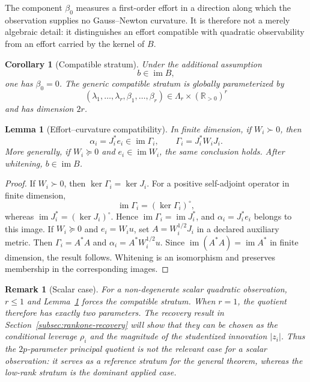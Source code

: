 \documentclass[10pt,a4paper]{article}
\newtheorem{corollary}[theorem]{Corollary}
\newtheorem{lemma}[theorem]{Lemma}
\newtheorem{remark}[theorem]{Remark}
\newcommand{\R}{\mathbb{R}}
\newcommand{\Ker}{\operatorname{ker}}
\newcommand{\Img}{\operatorname{im}}
\begin{document}
The component $\beta_0$ measures a first-order effort in a direction along which the observation supplies no Gauss--Newton curvature. It is therefore not a merely algebraic detail: it distinguishes an effort compatible with quadratic observability from an effort carried by the kernel of $B$.

\begin{corollary}[Compatible stratum]
Under the additional assumption
\[
b\in\Img B,
\]
one has $\beta_0=0$. The generic compatible stratum is globally parameterized by
\[
(\lambda_1,\ldots,\lambda_r,
 \beta_1,\ldots,\beta_r)
\in\Lambda_r\times(\R_{>0})^r
\]
and has dimension $2r$.
\label{cor:compatible-stratum}
\end{corollary}

\begin{lemma}[Effort--curvature compatibility]
In finite dimension, if $W_i\succ0$, then
\begin{equation}
\boxed{
\alpha_i=J_i^*e_i\in\Img\Gamma_i,
\qquad
\Gamma_i=J_i^*W_iJ_i.
}
\label{eq:compatibility-lemma}
\end{equation}
More generally, if $W_i\succeq0$ and $e_i\in\Img W_i$, the same conclusion holds. After whitening, $b\in\Img B$.
\label{lem:effort-curvature-compatibility}
\end{lemma}

\begin{proof}
If $W_i\succ0$, then $\Ker\Gamma_i=\Ker J_i$. For a positive self-adjoint operator in finite dimension,
\[
\Img\Gamma_i=(\Ker\Gamma_i)^\circ,
\]
whereas $\Img J_i^*=(\Ker J_i)^\circ$. Hence $\Img\Gamma_i=\Img J_i^*$, and $\alpha_i=J_i^*e_i$ belongs to this image. If $W_i\succeq0$ and $e_i=W_iu$, set $A=W_i^{1/2}J_i$ in a declared auxiliary metric. Then $\Gamma_i=A^*A$ and $\alpha_i=A^*W_i^{1/2}u$. Since $\Img(A^*A)=\Img A^*$ in finite dimension, the result follows. Whitening is an isomorphism and preserves membership in the corresponding images.
\end{proof}

\begin{remark}[Scalar case]
For a non-degenerate scalar quadratic observation, $r\leq1$ and Lemma~\ref{lem:effort-curvature-compatibility} forces the compatible stratum. When $r=1$, the quotient therefore has exactly two parameters. The recovery result in Section~\ref{subsec:rankone-recovery} will show that they can be chosen as the conditional leverage $\rho_i$ and the magnitude of the studentized innovation $|z_i|$. Thus the $2p$-parameter principal quotient is not the relevant case for a scalar observation: it serves as a reference stratum for the general theorem, whereas the low-rank stratum is the dominant applied case.
\end{remark}
\end{document}
